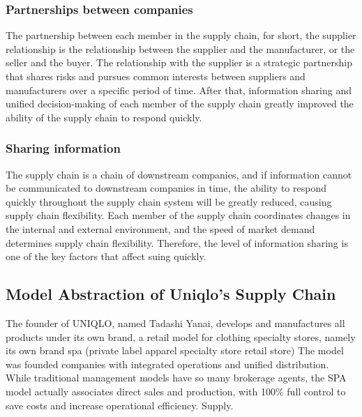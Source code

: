 \documentclass[12pt,a4paper]{article}
\begin{document}
\hypertarget{partnerships-between-companies}{%
\subsubsection{Partnerships between
companies}\label{partnerships-between-companies}}

The partnership between each member in the supply chain, for short, the
supplier relationship is the relationship between the supplier and the
manufacturer, or the seller and the buyer. The relationship with the
supplier is a strategic partnership that shares risks and pursues common
interests between suppliers and manufacturers over a specific period of
time. After that, information sharing and unified decision-making of
each member of the supply chain greatly improved the ability of the
supply chain to respond quickly.

\hypertarget{sharing-information}{%
\subsubsection{Sharing information}\label{sharing-information}}

The supply chain is a chain of downstream companies, and if information
cannot be communicated to downstream companies in time, the ability to
respond quickly throughout the supply chain system will be greatly
reduced, causing supply chain flexibility. Each member of the supply
chain coordinates changes in the internal and external environment, and
the speed of market demand determines supply chain flexibility.
Therefore, the level of information sharing is one of the key factors
that affect suing quickly.

\hypertarget{model-abstraction-of-uniqlos-supply-chain}{%
\subsection{Model Abstraction of Uniqlo's Supply
Chain}\label{model-abstraction-of-uniqlos-supply-chain}}

The founder of UNIQLO, named Tadashi Yanai, develops and manufactures
all products under its own brand, a retail model for clothing specialty
stores, namely its own brand spa (private label apparel specialty store
retail store) The model was founded companies with integrated operations
and unified distribution. While traditional management models have so
many brokerage agents, the SPA model actually associates direct sales
and production, with 100\% full control to save costs and increase
operational efficiency. Supply.
\end{document}
